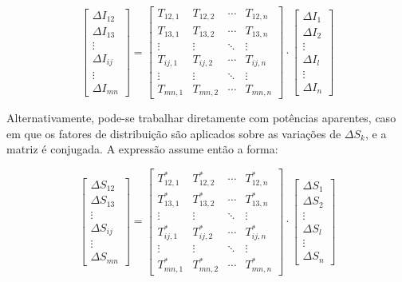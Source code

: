 \documentclass[journal]{IEEEtran}
\begin{document}
\begin{equation}
\begin{bmatrix}
\Delta I_{12} \\
\Delta I_{13} \\
\vdots \\
\Delta I_{ij} \\
\vdots \\
\Delta I_{mn}
\end{bmatrix}
=
\begin{bmatrix}
T_{12,1} & T_{12,2} & \cdots & T_{12,n} \\
T_{13,1} & T_{13,2} & \cdots & T_{13,n} \\
\vdots & \vdots & \ddots & \vdots \\
T_{ij,1} & T_{ij,2} & \cdots & T_{ij,n} \\
\vdots & \vdots & \ddots & \vdots \\
T_{mn,1} & T_{mn,2} & \cdots & T_{mn,n}
\end{bmatrix}
\cdot
\begin{bmatrix}
\Delta I_{1} \\
\Delta I_{2} \\
\vdots \\
\Delta I_{l} \\
\vdots \\
\Delta I_{n}
\end{bmatrix}
\label{eq:corrente_incremental}
\end{equation}

Alternativamente, pode-se trabalhar diretamente com potências aparentes, caso em que os fatores de distribuição são aplicados sobre as variações de \( \Delta S_k \), e a matriz é conjugada. A expressão assume então a forma:

\begin{equation}
\begin{bmatrix}
\Delta S_{12} \\
\Delta S_{13} \\
\vdots \\
\Delta S_{ij} \\
\vdots \\
\Delta S_{mn}
\end{bmatrix}
=
\begin{bmatrix}
T^{*}_{12,1} & T^{*}_{12,2} & \cdots & T^{*}_{12,n} \\
T^{*}_{13,1} & T^{*}_{13,2} & \cdots & T^{*}_{13,n} \\
\vdots & \vdots & \ddots & \vdots \\
T^{*}_{ij,1} & T^{*}_{ij,2} & \cdots & T^{*}_{ij,n} \\
\vdots & \vdots & \ddots & \vdots \\
T^{*}_{mn,1} & T^{*}_{mn,2} & \cdots & T^{*}_{mn,n}
\end{bmatrix}
\cdot
\begin{bmatrix}
\Delta S_{1} \\
\Delta S_{2} \\
\vdots \\
\Delta S_{l} \\
\vdots \\
\Delta S_{n}
\end{bmatrix}
\label{eq:potencia}
\end{equation}
\end{document}
